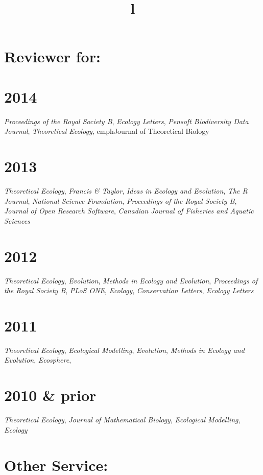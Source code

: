 \documentclass[margin]{res}
\begin{document}
\begin{resume}
\section{Reviewer for:}

\section{\textnormal{2014}}
\emph{Proceedings of the Royal Society B}, \emph{Ecology Letters}, \emph{Pensoft Biodiversity Data Journal}, \emph{Theoretical Ecology}, emph{Journal of Theoretical Biology}

\section{\textnormal{2013}}
\emph{Theoretical Ecology}, \emph{Francis \& Taylor}, \emph{Ideas in Ecology and Evolution}, \emph{The R Journal}, \emph{National Science Foundation}, \emph{Proceedings of the Royal Society B}, \emph{Journal of Open Research Software}, \emph{Canadian Journal of Fisheries and Aquatic Sciences} 

\section{\textnormal{2012}}
\emph{Theoretical Ecology}, \emph{Evolution}, \emph{Methods in Ecology and Evolution}, \emph{Proceedings of the Royal Society B}, \emph{PLoS ONE}, \emph{Ecology}, \emph{Conservation Letters}, \emph{Ecology Letters} 

\section{\textnormal{2011}}
\emph{Theoretical Ecology}, \emph{Ecological Modelling}, \emph{Evolution}, \emph{Methods in Ecology and Evolution}, \emph{Ecosphere}, 

\section{\textnormal{2010 \& prior}}
\emph{Theoretical Ecology}, \emph{Journal of Mathematical Biology}, \emph{Ecological Modelling}, \emph{Ecology}

\section{Other Service:} 
\begin{format}
\title{l}\\
\body 
\end{format}


\end{resume}
\end{document}
